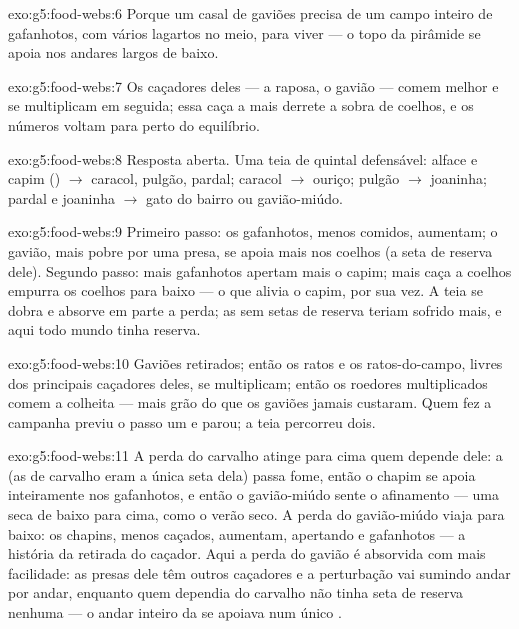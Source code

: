 \begin{solution}{exo:g5:food-webs:6}
Porque um casal de gaviões precisa de um campo inteiro de gafanhotos,
com vários lagartos no meio, para viver --- o topo da pirâmide se
apoia nos andares largos de baixo.
\end{solution}

\begin{solution}{exo:g5:food-webs:7}
Os caçadores deles --- a raposa, o gavião --- comem melhor e se
multiplicam em seguida; essa caça a mais derrete a sobra de coelhos,
e os números voltam para perto do equilíbrio.
\end{solution}

\begin{solution}{exo:g5:food-webs:8}
Resposta aberta. Uma teia de quintal defensável: alface e capim
() $\rightarrow$ caracol, pulgão, pardal; caracol
$\rightarrow$ ouriço; pulgão $\rightarrow$ joaninha; pardal e
joaninha $\rightarrow$ gato do bairro ou gavião-miúdo.
\end{solution}

\begin{solution}{exo:g5:food-webs:9}
Primeiro passo: os gafanhotos, menos comidos, aumentam; o gavião,
mais pobre por uma presa, se apoia mais nos coelhos (a seta de
reserva dele). Segundo passo: mais gafanhotos apertam mais o capim;
mais caça a coelhos empurra os coelhos para baixo --- o que alivia o
capim, por sua vez. A teia se dobra e absorve em parte a perda; as
 sem setas de reserva teriam sofrido mais, e aqui todo mundo
tinha reserva.
\end{solution}

\begin{solution}{exo:g5:food-webs:10}
Gaviões retirados; então os ratos e os ratos-do-campo, livres dos
principais caçadores deles, se multiplicam; então os roedores
multiplicados comem a colheita --- mais grão do que os gaviões jamais
custaram. Quem fez a campanha previu o passo um e parou; a teia
percorreu dois.
\end{solution}

\begin{solution}{exo:g5:food-webs:11}
A perda do carvalho atinge para cima quem depende dele: a 
(as  de carvalho eram a única seta dela) passa fome, então o
chapim se apoia inteiramente nos gafanhotos, e então o gavião-miúdo
sente o afinamento --- uma seca de baixo para cima, como o verão
seco. A perda do gavião-miúdo viaja para baixo: os chapins, menos
caçados, aumentam, apertando  e gafanhotos --- a história da
retirada do caçador. Aqui a perda do gavião é absorvida com mais
facilidade: as presas dele têm outros caçadores e a perturbação vai
sumindo andar por andar, enquanto quem dependia do carvalho não tinha
seta de reserva nenhuma --- o andar inteiro da  se apoiava num
único .
\end{solution}

